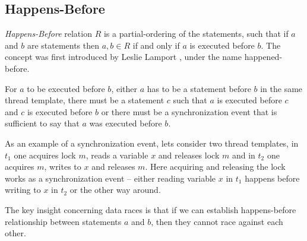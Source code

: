 \documentclass[..thesis.tex]{subfiles}
\begin{document}
\subsection{Happens-Before}

\textit{Happens-Before} relation $R$ is a partial-ordering of the statements, such that if $a$ and $b$ are statements then  $a,b \in R$ if and only if $a$ is executed before $b$. The concept was first introduced by Leslie Lamport \cite{lamport_time_1978}, under the name happened-before.

For $a$ to be executed before $b$, either $a$ has to be a statement before $b$ in the same thread template, there must be a statement $c$ such that $a$ is executed before $c$ and $c$ is executed before $b$ or there must be a synchronization event that is sufficient to say that $a$ was executed before $b$.

As an example of a synchronization event, lets consider two thread templates, in $t_1$ one acquires lock $m$, reads a variable $x$ and releases lock $m$ and in $t_2$ one acquires $m$, writes to $x$ and releases $m$. Here acquiring and releasing the lock works as a synchronization event -- either reading variable $x$ in $t_1$ happens before writing to $x$ in $t_2$ or the other way around.

The key insight concerning data races is that if we can establish happens-before relationship between statements $a$ and $b$, then they cannot race against each other. 
\end{document}
